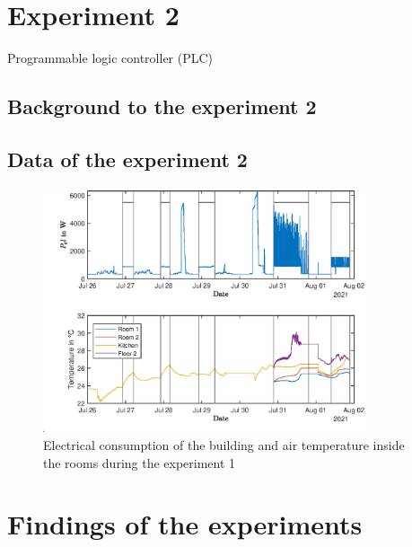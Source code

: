 \section{Experiment 2}
\label{sec:Experiment2}
Programmable logic controller (PLC)

\subsection{Background to the experiment 2}
\label{subsec:Backgroud to experiment 2}

\subsection{Data of the experiment 2}
\label{subsec:Data of the experiment 2}
\begin{figure}
            \centering
            \includegraphics[width=0.85\textwidth]{figure/Trainingsdaten_P_el_und_Raumtemperaturen_latex.eps}
           \caption{Electrical consumption of the building and air temperature inside the rooms during the experiment 1}
           \label{fig:P_elTemperatureExperiment1}
    \end{figure}
\section{Findings of the experiments}
\label{sec:findings of the experiments}
